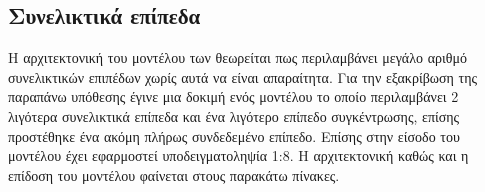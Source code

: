 
\subsection{Συνελικτικά επίπεδα}
Η αρχιτεκτονική του μοντέλου των  θεωρείται πως περιλαμβάνει μεγάλο αριθμό συνελικτικών επιπέδων χωρίς αυτά να είναι απαραίτητα. Για την εξακρίβωση της παραπάνω υπόθεσης έγινε μια δοκιμή ενός μοντέλου το οποίο περιλαμβάνει 2 λιγότερα συνελικτικά επίπεδα και ένα λιγότερο επίπεδο συγκέντρωσης, επίσης προστέθηκε ένα ακόμη πλήρως συνδεδεμένο επίπεδο. Επίσης στην είσοδο του μοντέλου έχει εφαρμοστεί υποδειγματοληψία 1:8. Η αρχιτεκτονική καθώς και η επίδοση του μοντέλου φαίνεται στους παρακάτω πίνακες.

